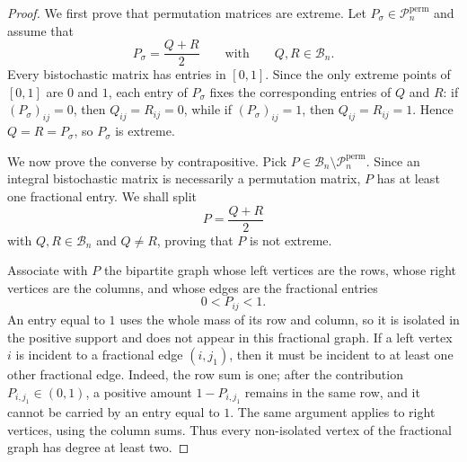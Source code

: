 \begin{proof}
	We first prove that permutation matrices are extreme. Let $P_\sigma\in\mathcal P_n^{\mathrm{perm}}$ and assume that
	\[
		P_\sigma=\frac{Q+R}{2}
		\qquad\text{with}\qquad
		Q,R\in\mathcal B_n .
	\]
	Every bistochastic matrix has entries in $[0,1]$. Since the only extreme points of $[0,1]$ are $0$ and $1$, each entry of $P_\sigma$ fixes the corresponding entries of $Q$ and $R$: if $(P_\sigma)_{ij}=0$, then $Q_{ij}=R_{ij}=0$, while if $(P_\sigma)_{ij}=1$, then $Q_{ij}=R_{ij}=1$. Hence $Q=R=P_\sigma$, so $P_\sigma$ is extreme.

	We now prove the converse by contrapositive. Pick $P\in\mathcal B_n\setminus\mathcal P_n^{\mathrm{perm}}$. Since an integral bistochastic matrix is necessarily a permutation matrix, $P$ has at least one fractional entry. We shall split
	\[
		P=\frac{Q+R}{2}
	\]
	with $Q,R\in\mathcal B_n$ and $Q\neq R$, proving that $P$ is not extreme.

	Associate with $P$ the bipartite graph whose left vertices are the rows, whose right vertices are the columns, and whose edges are the fractional entries
	\[
		0<P_{ij}<1 .
	\]
	An entry equal to $1$ uses the whole mass of its row and column, so it is isolated in the positive support and does not appear in this fractional graph. If a left vertex $i$ is incident to a fractional edge $(i,j_1)$, then it must be incident to at least one other fractional edge. Indeed, the row sum is one; after the contribution $P_{i,j_1}\in(0,1)$, a positive amount $1-P_{i,j_1}$ remains in the same row, and it cannot be carried by an entry equal to $1$. The same argument applies to right vertices, using the column sums. Thus every non-isolated vertex of the fractional graph has degree at least two.


\end{proof}
